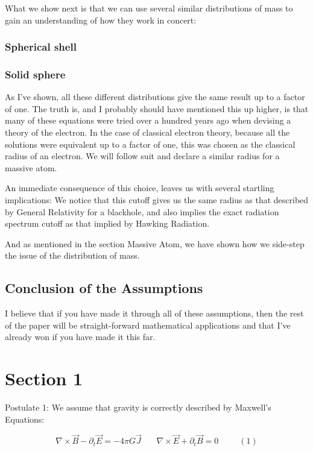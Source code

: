 \documentclass {article}
\begin{document}
What we show next is that we can use several similar distributions of mass to gain an understanding of how they work in concert:

\subsubsection{Spherical shell}

\subsubsection{Solid sphere}

As I’ve shown, all these different distributions give the same result up to a factor of one. The truth is, and I probably should have mentioned this up higher, is that many of these equations were tried over a hundred years ago when devising a theory of the electron. In the case of classical electron theory, because all the solutions were equivalent up to a factor of one, this was chosen as the classical radius of an electron. We will follow suit and declare a similar radius for a massive atom.

An immediate consequence of this choice, leaves us with several startling implications: We notice that this cutoff gives us the same radius as that described by General Relativity for a blackhole, and also implies the exact radiation spectrum cutoff as that implied by Hawking Radiation.

And as mentioned in the section Massive Atom, we have shown how we side-step the issue of the distribution of mass.

\subsection{Conclusion of the Assumptions}

I believe that if you have made it through all of these assumptions, then the rest of the paper will be straight-forward mathematical applications and that I’ve already won if you have made it this far.


\section{Section 1}

Postulate 1: We assume that gravity is correctly described by Maxwell's Equations:

$$\nabla \times \vec B  - \partial_t \vec E  = -4 \pi G \vec J ~~~~~~~~ \nabla \times \vec E + \partial_t \vec B = 0    ~~~~~~~~~~~ (1)$$
\end{document}
